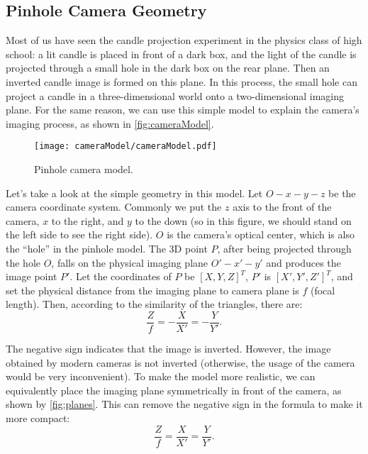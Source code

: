 \subsection{Pinhole Camera Geometry}
Most of us have seen the candle projection experiment in the physics class of high school: a lit candle is placed in front of a dark box, and the light of the candle is projected through a small hole in the dark box on the rear plane. Then an inverted candle image is formed on this plane. In this process, the small hole can project a candle in a three-dimensional world onto a two-dimensional imaging plane. For the same reason, we can use this simple model to explain the camera's imaging process, as shown in \autoref{fig:cameraModel}.

\begin{figure}[!ht]
	\centering
	\texttt{[image: cameraModel/cameraModel.pdf]}
	\caption{Pinhole camera model. }
	\label{fig:cameraModel}
\end{figure}

Let's take a look at the simple geometry in this model. Let $O-x-y-z$ be the camera coordinate system. Commonly we put the $z$ axis to the front of the camera, $x$ to the right, and $y$ to the down (so in this figure, we should stand on the left side to see the right side). $O$ is the camera's optical center, which is also the ``hole'' in the pinhole model. The 3D point $P$, after being projected through the hole $O$, falls on the physical imaging plane $O'-x'-y'$ and produces the image point $P'$. Let the coordinates of $P$ be $[X,Y,Z]^T$, $P'$ is $[X',Y',Z']^T$, and set the physical distance from the imaging plane to camera plane is $f$ (focal length). Then, according to the similarity of the triangles, there are:
\begin{equation}
\frac{Z}{f} = -\frac{X}{{X'}} =-\frac{Y}{{Y'}}.
\end{equation}

The negative sign indicates that the image is inverted. However, the image obtained by modern cameras is not inverted (otherwise, the usage of the camera would be very inconvenient). To make the model more realistic, we can equivalently place the imaging plane symmetrically in front of the camera, as shown by \autoref{fig:planes}. This can remove the negative sign in the formula to make it more compact:
\begin{equation}
\frac{Z}{f} = \frac{X}{{X'}} =\frac{Y}{{Y'}}.
\end{equation}

